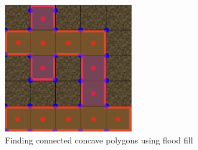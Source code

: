 \begin{figure}[H]
    \centering
    \includegraphics[width=0.5\textwidth]{figures/generating_levels/wall_with_convex.png}
    \caption{Finding connected concave polygons using flood fill}\label{fig:wall_with_convex} 
\end{figure}
